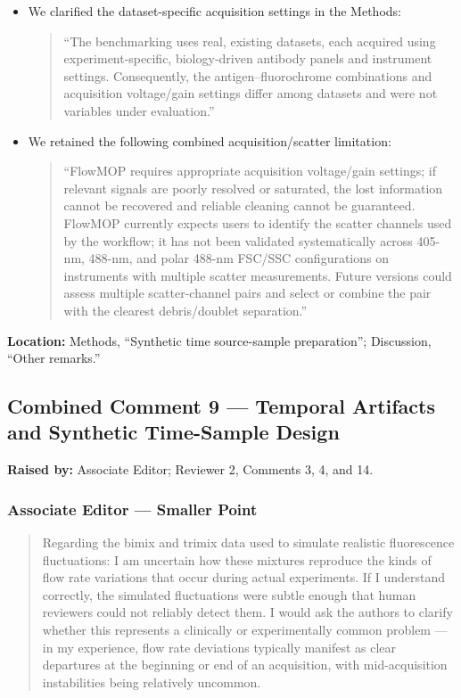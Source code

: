 \documentclass[
  11pt,
  a4paper,
]{article}
\begin{document}
\begin{itemize}
\item
  We clarified the dataset-specific acquisition settings in the Methods:

  \begin{quote}
  ``The benchmarking uses real, existing datasets, each acquired using
  experiment-specific, biology-driven antibody panels and instrument
  settings. Consequently, the antigen--fluorochrome combinations and
  acquisition voltage/gain settings differ among datasets and were not
  variables under evaluation.''
  \end{quote}
\item
  We retained the following combined acquisition/scatter limitation:

  \begin{quote}
  ``FlowMOP requires appropriate acquisition voltage/gain settings; if
  relevant signals are poorly resolved or saturated, the lost
  information cannot be recovered and reliable cleaning cannot be
  guaranteed. FlowMOP currently expects users to identify the scatter
  channels used by the workflow; it has not been validated
  systematically across 405-nm, 488-nm, and polar 488-nm FSC/SSC
  configurations on instruments with multiple scatter measurements.
  Future versions could assess multiple scatter-channel pairs and select
  or combine the pair with the clearest debris/doublet separation.''
  \end{quote}
\end{itemize}

\textbf{Location:} Methods, ``Synthetic time source-sample
preparation''; Discussion, ``Other remarks.''

\subsection{Combined Comment 9 --- Temporal Artifacts and Synthetic
Time-Sample
Design}\label{combined-comment-9--temporal-artifacts-and-synthetic-time-sample-design}

\textbf{Raised by:} Associate Editor; Reviewer 2, Comments 3, 4, and 14.

\subsubsection{Associate Editor --- Smaller
Point}\label{associate-editor--smaller-point-1}

\begin{quote}
Regarding the bimix and trimix data used to simulate realistic
fluorescence fluctuations: I am uncertain how these mixtures reproduce
the kinds of flow rate variations that occur during actual experiments.
If I understand correctly, the simulated fluctuations were subtle enough
that human reviewers could not reliably detect them. I would ask the
authors to clarify whether this represents a clinically or
experimentally common problem --- in my experience, flow rate deviations
typically manifest as clear departures at the beginning or end of an
acquisition, with mid-acquisition instabilities being relatively
uncommon.
\end{quote}
\end{document}
